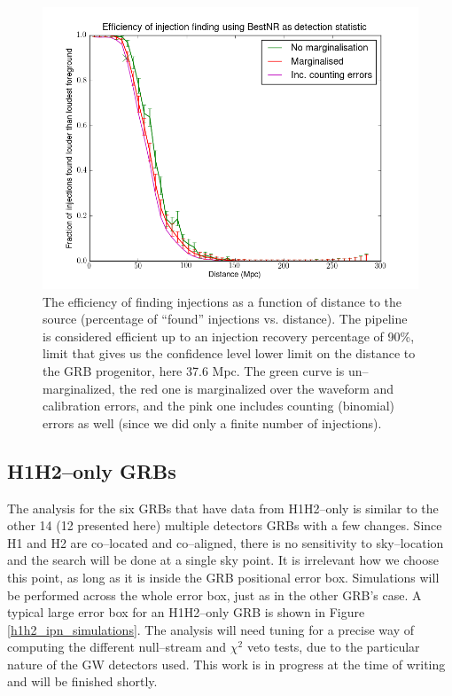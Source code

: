 \begin{figure}[htb]
\centering
\includegraphics[width=28pc]{Images/distance_excl_stats.png}
\caption{The efficiency of finding injections as a function of distance to the source (percentage of ``found'' injections vs. distance). The pipeline is considered efficient up to an injection recovery percentage of 90\%, limit that gives us the confidence level lower limit on the distance to the GRB progenitor, here 37.6 Mpc. The green curve is un--marginalized, the red one is marginalized over the waveform and calibration errors, and the pink one includes counting (binomial) errors as well (since we did only a finite number of injections).}
\label{distance_excl_stats}
\end{figure}

\subsection{H1H2--only GRBs}

The analysis for the six GRBs that have data from H1H2--only is similar to the other 14 (12 presented here) multiple detectors GRBs with a few changes. Since H1 and H2 are co--located and co--aligned, there is no sensitivity to sky--location and the search will be done at a single sky point. It is irrelevant how we choose this point, as long as it is inside the GRB positional error box. Simulations will be performed across the whole error box, just as in the other GRB's case. A typical large error box for an H1H2--only GRB is shown in Figure \ref{h1h2_ipn_simulations}. The analysis will need tuning for a precise way of computing the different null--stream and $\chi^2$ veto tests, due to the particular nature of the GW detectors used. This work is in progress at the time of writing and will be finished shortly.

